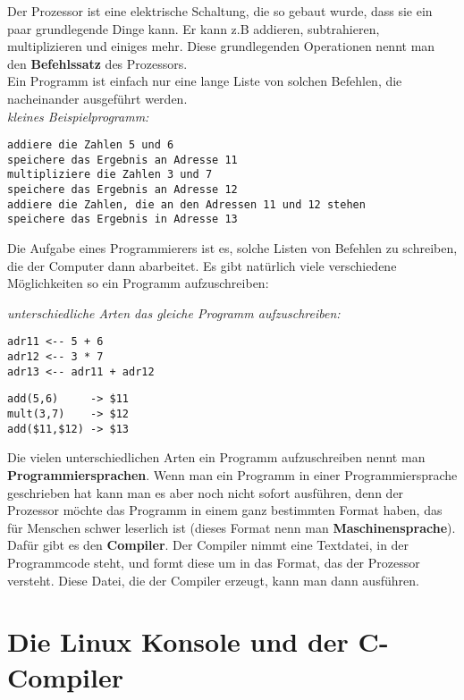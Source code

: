 \documentclass[c_worksheet.tex]{subfiles}
\begin{document}
Der Prozessor ist eine elektrische Schaltung, die so gebaut wurde, dass sie ein paar grundlegende Dinge kann.
Er kann z.B addieren, subtrahieren, multiplizieren und einiges mehr. Diese grundlegenden Operationen nennt man den \textbf{Befehlssatz} des Prozessors.\\
Ein Programm ist einfach nur eine lange Liste von solchen Befehlen, die nacheinander ausgeführt werden. \\

\textit{kleines Beispielprogramm:}
\begin{lstlisting}[frame=lrtb]
addiere die Zahlen 5 und 6
speichere das Ergebnis an Adresse 11
multipliziere die Zahlen 3 und 7
speichere das Ergebnis an Adresse 12
addiere die Zahlen, die an den Adressen 11 und 12 stehen
speichere das Ergebnis in Adresse 13
\end{lstlisting}
\vspace{5pt}

Die Aufgabe eines Programmierers ist es, solche Listen von Befehlen zu schreiben, die der Computer dann abarbeitet. Es gibt natürlich viele verschiedene Möglichkeiten so ein Programm aufzuschreiben:\\
\vspace{5pt}

\textit{unterschiedliche Arten das gleiche Programm aufzuschreiben:}
\begin{multicols}{2}
\begin{lstlisting}[frame=lrtb]
adr11 <-- 5 + 6
adr12 <-- 3 * 7
adr13 <-- adr11 + adr12
\end{lstlisting}
\begin{lstlisting}[frame=lrtb]
add(5,6)     -> $11
mult(3,7)    -> $12
add($11,$12) -> $13
\end{lstlisting}
\end{multicols}
Die vielen unterschiedlichen Arten ein Programm aufzuschreiben nennt man \textbf{Programmiersprachen}. Wenn man ein Programm in einer Programmiersprache geschrieben hat kann man es aber noch nicht sofort ausführen, denn der Prozessor möchte das Programm in einem ganz bestimmten Format haben, das für Menschen schwer leserlich ist (dieses Format nenn man \textbf{Maschinensprache}). Dafür gibt es den \textbf{Compiler}. Der Compiler nimmt eine Textdatei, in der Programmcode steht, und formt diese um in das Format, das der Prozessor versteht. Diese Datei, die der Compiler erzeugt, kann man dann ausführen.

\newpage
\section{Die Linux Konsole und der C-Compiler}
\end{document}

